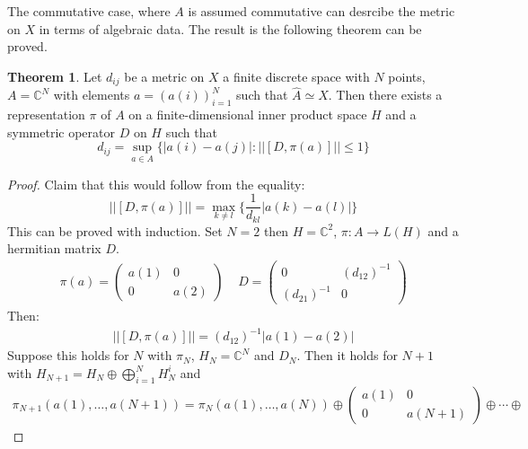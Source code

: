 \documentclass[a4paper]{article}
\theoremstyle{definition}
\theoremstyle{definition}
\theoremstyle{definition}
\theoremstyle{theorem}
\newtheorem{theorem}{Theorem}
\theoremstyle{theorem}
\theoremstyle{definition}
\begin{document}
The commutative case, where $A$ is assumed commutative can desrcibe the metric on $X$ in terms of
algebraic data. The result is the following theorem can be proved.
\begin{theorem}
    Let $d_{ij}$ be a metric on $X$ a finite discrete space with $N$ points, $A = \mathbb{C}^N$
    with elements $a = (a(i))_{i=1}^N$ such that $\hat{A} \simeq X$. Then there exists a
    representation $\pi$ of $A$ on a finite-dimensional inner product space $H$ and a symmetric
    operator $D$ on $H$ such that
    \begin{equation}
        d_{ij} = \sup_{a\in A}\{|a(i)-a(j)| : ||[D, \pi(a)]|| \leq 1\}
    \end{equation}
\end{theorem}

\begin{proof}
    Claim that this would follow from the equality:
    \begin{equation}
        ||[D, \pi(a)]|| = \max_{k\neq l} \big\{\frac{1}{d_{kl}}|a(k) - a(l)|\big\}
        \label{induction}
    \end{equation}
    This can be proved with induction. Set $N=2$ then $H=\mathbb{C}^2$, $\pi:A\rightarrow L(H)$ and
    a hermitian matrix $D$.
    \begin{align}
        \pi(a) =
        \begin{pmatrix}
            a(1) & 0 \\
            0 & a(2)
        \end{pmatrix}
        \;\;\;\;
        D =
        \begin{pmatrix}
            0 & (d_{12})^{-1} \\
            (d_{21})^{-1} & 0
        \end{pmatrix}
    \end{align}
    Then:
    \begin{align}
        ||[D, \pi(a)]|| = (d_{12})^{-1} | a(1) - a(2)|
    \end{align}
    Suppose this holds for $N$ with $\pi_N$, $H_N = \mathbb{C}^N$ and $D_N$.
    Then it holds for $N+1$ with $H_{N+1} = H_{N} \oplus \bigoplus_{i=1}^N H_N^i$ and
    \begin{align}
        \pi_{N+1}(a(1),\dots,a(N+1)) = \pi_N(a(1),\dots,a(N))
        \oplus
        \begin{pmatrix}
            a(1) & 0 \\
            0   & a(N+1)
        \end{pmatrix}
        \oplus \cdots \oplus

\end{align}
\end{proof}
\end{document}
